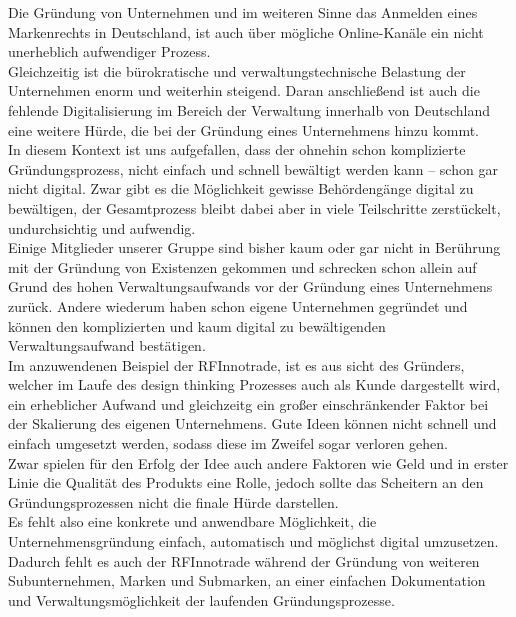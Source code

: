Die Gründung von Unternehmen und im weiteren Sinne das Anmelden eines Markenrechts in Deutschland, ist auch über mögliche Online-Kanäle ein nicht unerheblich aufwendiger Prozess.\\
Gleichzeitig ist die bürokratische und verwaltungstechnische Belastung der Unternehmen enorm und weiterhin steigend. Daran anschließend ist auch die fehlende Digitalisierung im Bereich der Verwaltung innerhalb von Deutschland eine weitere Hürde, die bei der Gründung eines Unternehmens hinzu kommt.\\
In diesem Kontext ist uns aufgefallen, dass der ohnehin schon komplizierte Gründungsprozess, nicht einfach und schnell bewältigt werden kann – schon gar nicht digital. Zwar gibt es die Möglichkeit gewisse Behördengänge digital zu bewältigen, der Gesamtprozess bleibt dabei aber in viele Teilschritte zerstückelt, undurchsichtig und aufwendig.\\
Einige Mitglieder unserer Gruppe sind bisher kaum oder gar nicht in Berührung mit der Gründung von Existenzen gekommen und schrecken schon allein auf Grund des hohen Verwaltungsaufwands vor der Gründung eines Unternehmens zurück. Andere wiederum haben schon eigene Unternehmen gegründet und können den komplizierten und kaum digital zu bewältigenden Verwaltungsaufwand bestätigen.\\
Im anzuwendenen Beispiel der RFInnotrade, ist es aus sicht des Gründers, welcher im Laufe des design thinking Prozesses auch als Kunde dargestellt wird, ein erheblicher Aufwand und gleichzeitg ein großer einschränkender Faktor bei der Skalierung des eigenen Unternehmens. Gute Ideen können nicht schnell und einfach umgesetzt werden, sodass diese im Zweifel sogar verloren gehen.\\
Zwar spielen für den Erfolg der Idee auch andere Faktoren wie Geld und in erster Linie die Qualität des Produkts eine Rolle, jedoch sollte das Scheitern an den Gründungsprozessen nicht die finale Hürde darstellen.\\
Es fehlt also eine konkrete und anwendbare Möglichkeit, die Unternehmensgründung einfach, automatisch und möglichst digital umzusetzen. Dadurch fehlt es auch der RFInnotrade während der Gründung von weiteren Subunternehmen, Marken und Submarken, an einer einfachen Dokumentation und Verwaltungsmöglichkeit der laufenden Gründungsprozesse.\\